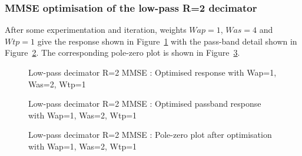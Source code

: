 \documentclass[a4paper,twoside,10pt,english]{report}
\begin{document}
\subsubsection{MMSE optimisation of the low-pass R=2 decimator}
After some experimentation and iteration, weights $Wap=1$, $Was=4$ and 
$Wtp=1$ give the response shown in Figure~\ref{fig:Decimator-R-2-MMSE-x1}
with the pass-band detail shown in 
Figure~\ref{fig:Decimator-R-2-MMSE-x1-passband}. The corresponding 
pole-zero plot is shown in Figure~\ref{fig:Decimator-R-2-MMSE-x1-pz}.
\begin{figure}[!htbp]
\begin{center}
\scalebox{0.7}{}
\caption{Low-pass decimator R=2 MMSE : Optimised response with Wap=1, Was=2, Wtp=1}
\label{fig:Decimator-R-2-MMSE-x1}
\end{center}
\end{figure}
\begin{figure}[!htbp]
\begin{center}
\scalebox{0.7}{}
\caption{Low-pass decimator R=2 MMSE : Optimised passband response with Wap=1, Was=2, Wtp=1}
\label{fig:Decimator-R-2-MMSE-x1-passband}
\end{center}
\end{figure}
\begin{figure}[!htbp]
\begin{center}
\scalebox{0.7}{}
\caption{Low-pass decimator R=2 MMSE : Pole-zero plot after optimisation with Wap=1, Was=2, Wtp=1}
\label{fig:Decimator-R-2-MMSE-x1-pz}
\end{center}
\end{figure}
\end{document}
